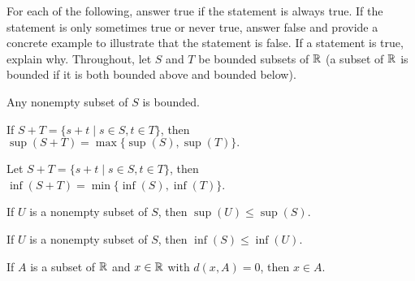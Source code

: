  
\item For each of the following, answer true if the statement is always true. If the statement is only sometimes true or never true, answer false and provide a concrete example to illustrate that the statement is false. If a statement is true, explain why.  Throughout, let $S$ and $T$ be bounded subsets of $\mathbb{R}$ (a subset of $\mathbb{R}$ is bounded if it is both bounded above and bounded below).
	\ba
	\item Any nonempty subset of $S$ is bounded.

	\item  If $S + T = \{s+t \mid s \in S, t \in T\}$, then $\sup(S + T) = \max\{\sup(S), \sup(T)\}.$ 

	\item  Let $S + T = \{s+t \mid s \in S, t \in T\}$, then $\inf(S + T) = \min\{\inf(S), \inf(T)\}$. 
	
	\item If $U$ is a nonempty subset of $S$, then $\sup(U) \leq \sup(S)$.
	
	\item If $U$ is a nonempty subset of $S$, then $\inf(S) \leq \inf(U)$.

	\item If $A$ is a subset of $\mathbb{R}$ and $x \in \mathbb{R}$ with $d(x,A) = 0$, then $x \in A$.
	
	\ea

